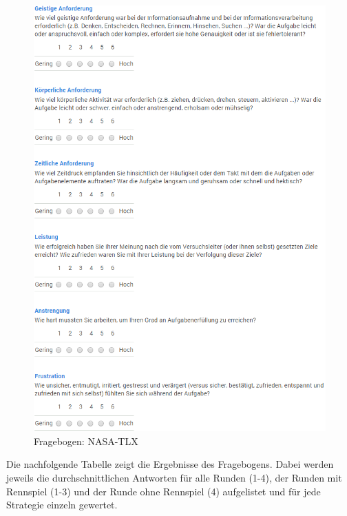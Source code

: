 \documentclass[12pt,a4paper]{scrartcl}
\begin{document}
\begin{figure}[H]
\begin{center}
\includegraphics[width=14cm]{nasa.png}
\caption{Fragebogen: NASA-TLX}
\label{fbnasatlx1}
\end{center}
\end{figure}

Die nachfolgende Tabelle zeigt die Ergebnisse des Fragebogens. Dabei werden jeweils die durchschnittlichen Antworten für alle Runden (1-4), der Runden mit Rennspiel (1-3) und der Runde ohne Rennspiel (4) aufgelistet und für jede Strategie einzeln gewertet. 

\newpage
\end{document}
